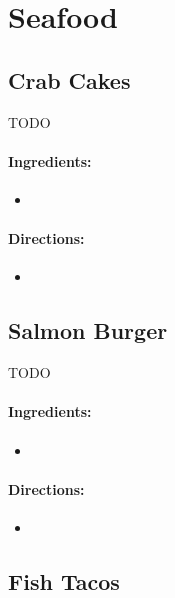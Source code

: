 \documentclass{article}
\begin{document}
\section{Seafood}

\subsection{Crab Cakes}

TODO

\paragraph{Ingredients:}

\begin{itemize}
	\item
\end{itemize}

\paragraph{Directions:}
\begin{itemize}
	\item
\end{itemize}


\subsection{Salmon Burger}

TODO

\paragraph{Ingredients:}

\begin{itemize}
	\item
\end{itemize}

\paragraph{Directions:}
\begin{itemize}
	\item
\end{itemize}


\subsection{Fish Tacos}{}
\end{document}
